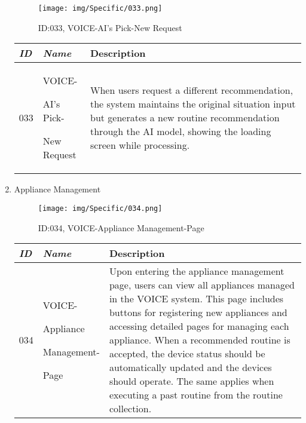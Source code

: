 \documentclass[conference]{IEEEtran}
\begin{document}
\begin{enumerate}[label=\arabic*]
    \begin{figure}[h]
        \centering
        \texttt{[image: img/Specific/033.png]}
        \caption{ID:033, VOICE-AI's Pick-New Request}
    \end{figure}

    \begin{table}[h]
    \def\arraystretch{1.2} \small
        \begin{tabular}{|p{1cm}|p{1.8cm}|p{4.8cm}|}
        \hline
            \textit{\textbf{ID}} & \textit{\textbf{Name}} & {\textbf{Description}} \\
        \hline
            033 \par & VOICE-\par AI's Pick-\par New Request & When users request a different recommendation, the system maintains the original situation input but generates a new routine recommendation through the AI model, showing the loading screen while processing. \\
        \hline
        \end{tabular}
    \end{table}

    \newpage

    \item Appliance Management\par
    \vspace{0.3em}

    \begin{figure}[h]
        \centering
        \texttt{[image: img/Specific/034.png]}
        \caption{ID:034, VOICE-Appliance Management-Page}
    \end{figure}

    \begin{table}[h]
    \def\arraystretch{1.2} \small
        \begin{tabular}{|p{1cm}|p{1.8cm}|p{4.8cm}|}
        \hline
            \textit{\textbf{ID}} & \textit{\textbf{Name}} & {\textbf{Description}} \\
        \hline
            034 \par & VOICE-\par Appliance\par Management-\par Page & Upon entering the appliance management page, users can view all appliances managed in the VOICE system. This page includes buttons for registering new appliances and accessing detailed pages for managing each appliance. When a recommended routine is accepted, the device status should be automatically updated and the devices should operate. The same applies when executing a past routine from the routine collection. \\
        \hline
        \end{tabular}
    \end{table}


\end{enumerate}
\end{document}
